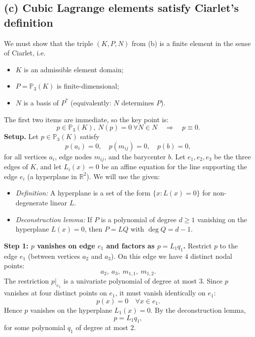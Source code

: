 \subsection*{(c) Cubic Lagrange elements satisfy Ciarlet's definition}
We must show that the triple $(K,P,N)$ from (b) is a finite element in the sense of Ciarlet, i.e.
\begin{itemize}
    \item $K$ is an admissible element domain;
    \item $P=\mathbb{P}_3(K)$ is finite-dimensional;
    \item $N$ is a basis of $P^\ast$ (equivalently: $N$ determines $P$).
\end{itemize}
The first two items are immediate, so the key point is:
\[
    \boxed{
        p \in \mathbb{P}_3(K),\ N(p) = 0\ \forall N\in N
        \quad \Rightarrow\quad
        p \equiv 0.
    }
\]
\textbf{Setup.}
Let $p \in \mathbb{P}_3(K)$ satisfy
\[
    p(a_i) = 0,\quad
    p(m_{ij}) = 0,\quad
    p(b) = 0,
\]
for all vertices $a_i$, edge nodes $m_{ij}$, and the barycenter $b$.
Let $e_1,e_2,e_3$ be the three edges of $K$, and let $L_i(x)=0$ be an affine equation for
the line supporting the edge $e_i$ (a hyperplane in $\mathbb{R}^2$).
We will use the given:
\begin{itemize}
    \item \emph{Definition:} A hyperplane is a set of the form $\{x : L(x)=0\}$ for non-degenerate
          linear $L$.
    \item \emph{Deconstruction lemma:} If $P$ is a polynomial of degree $d\ge 1$ vanishing on the
          hyperplane $L(x)=0$, then $P = L Q$ with $\deg Q = d-1$.
\end{itemize}
\textbf{Step 1: $p$ vanishes on edge $e_1$ and factors as $p = L_1 q_1$.}
Restrict $p$ to the edge $e_1$ (between vertices $a_2$ and $a_3$).
On this edge we have $4$ distinct nodal points:
\[
    a_2,\ a_3,\ m_{1,1},\ m_{1,2}.
\]
The restriction $p|_{e_1}$ is a univariate polynomial of degree at most $3$.
Since $p$ vanishes at four distinct points on $e_1$, it must vanish identically on $e_1$:
\[
    p(x) = 0 \quad \forall x \in e_1.
\]
Hence $p$ vanishes on the hyperplane $L_1(x)=0$.
By the deconstruction lemma,
\[
    p = L_1 q_1,
\]
for some polynomial $q_1$ of degree at most $2$.

